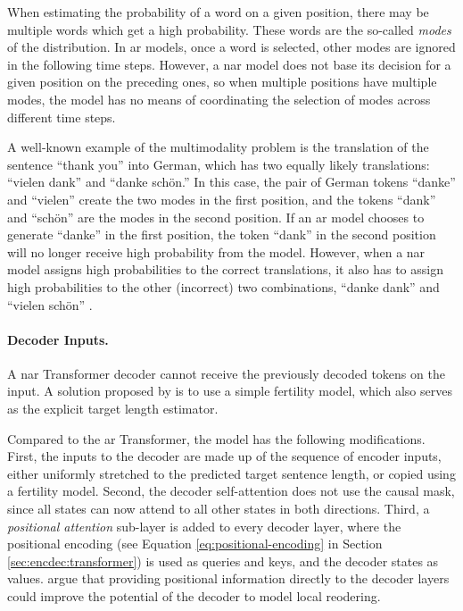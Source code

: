 When estimating the probability of a word on a given position, there may be
multiple words which get a high probability. These words are the so-called
\emph{modes} of the distribution. In \acl{ar} models, once a word is selected,
other modes are ignored in the following time steps. However, a \acl{nar} model
does not base its decision for a given position on the preceding ones, so when
multiple positions have multiple modes, the model has no means of coordinating
the selection of modes across different time steps.

A well-known example of the multimodality problem is the translation of the
sentence ``thank you'' into German, which has two equally likely translations:
``vielen dank'' and ``danke schön.'' In this case, the pair of German tokens
``danke'' and ``vielen'' create the two modes in the first position, and the
tokens ``dank'' and ``schön'' are the modes in the second position. If an
\acl{ar} model chooses to generate ``danke'' in the first position, the token
``dank'' in the second position will no longer receive high probability from
the model. However, when a \acl{nar} model assigns high probabilities to the
correct translations, it also has to assign high probabilities to the other
(incorrect) two combinations, ``danke dank'' and ``vielen schön''
\citep{gu2017nonautoregressive}.

\paragraph{Decoder Inputs.} A \acs{nar} Transformer decoder cannot
receive the previously decoded tokens on the input. A solution proposed by
\citet{gu2017nonautoregressive} is to use a simple fertility model, which also
serves as the explicit target length estimator.

Compared to the \acl{ar} Transformer, the model has the following
modifications. First, the inputs to the decoder are made up of the sequence of
encoder inputs, either uniformly stretched to the predicted target sentence
length, or copied using a fertility model. Second, the decoder self-attention
does not use the causal mask, since all states can now attend to all other
states in both directions. Third, a \emph{positional attention} sub-layer is
added to every decoder layer, where the positional encoding (see Equation
\ref{eq:positional-encoding} in Section \ref{sec:encdec:transformer}) is used
as queries and keys, and the decoder states as
values. \citet{gu2017nonautoregressive} argue that providing positional
information directly to the decoder layers could improve the potential of the
decoder to model local reodering.

